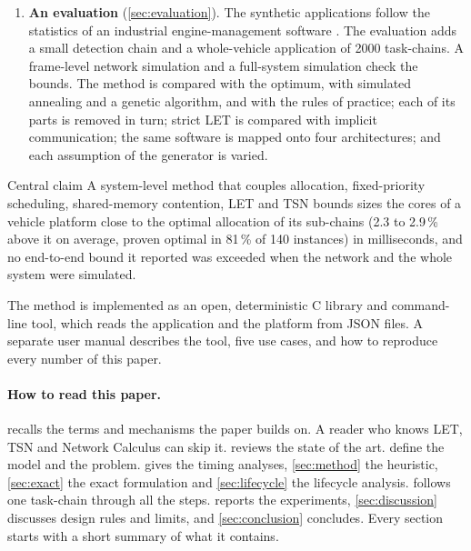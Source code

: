 \begin{enumerate}[label=\textbf{C\arabic*.}, leftmargin=2.2em]
fixed hardware. This trades the hardware cost against the number of
updates the platform absorbs.
\item \textbf{An evaluation} (\cref{sec:evaluation}). The synthetic
applications follow the statistics of an industrial engine-management
software \cite{kramer2015waters}. The evaluation adds a small detection
chain and a whole-vehicle application of 2000 task-chains. A frame-level network simulation and a full-system simulation
check the bounds. The method is compared with the optimum, with simulated
annealing and a genetic algorithm, and with the rules of practice; each of
its parts is removed in turn; strict LET is compared with implicit
communication; the same software is mapped onto four architectures; and
each assumption of the generator is varied.
\end{enumerate}
\begin{keybox}{Central claim}
A system-level method that couples allocation, fixed-priority scheduling,
shared-memory contention, LET and TSN bounds sizes the cores of a vehicle
platform close to the optimal allocation of its sub-chains (2.3 to
2.9\,\% above it on average, proven optimal in 81\,\% of 140 instances)
in milliseconds, and no end-to-end bound it reported was exceeded when
the network and the whole system were simulated.
\end{keybox}
The method is implemented as an open, deterministic C library and
command-line tool, which reads the application and the platform from JSON
files. A separate user manual describes the tool, five use cases, and how
to reproduce every number of this paper.

\paragraph{How to read this paper.}  recalls the
terms and mechanisms the paper builds on. A reader who knows LET, TSN and
Network Calculus can skip it.  reviews the state of the
art.  define the model and the problem.
 gives the timing analyses, \cref{sec:method} the
heuristic, \cref{sec:exact} the exact formulation and
\cref{sec:lifecycle} the lifecycle analysis.  follows
one task-chain through all the steps.  reports the
experiments, \cref{sec:discussion} discusses design rules and limits, and
\cref{sec:conclusion} concludes. Every section starts with a short summary
of what it contains.
